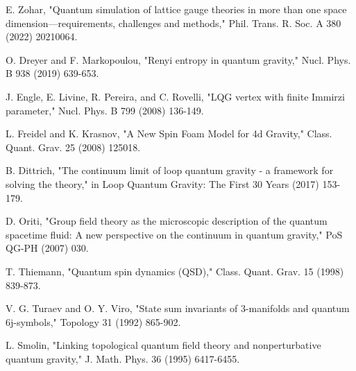 \documentclass[11pt, a4paper]{article}
\theoremstyle{plain}
\theoremstyle{definition}
\theoremstyle{remark}
\begin{document}
\begin{thebibliography}{99}
 E. Zohar, "Quantum simulation of lattice gauge theories in more than one space dimension—requirements, challenges and methods," Phil. Trans. R. Soc. A 380 (2022) 20210064.

 O. Dreyer and F. Markopoulou, "Renyi entropy in quantum gravity," Nucl. Phys. B 938 (2019) 639-653.

 J. Engle, E. Livine, R. Pereira, and C. Rovelli, "LQG vertex with finite Immirzi parameter," Nucl. Phys. B 799 (2008) 136-149.

 L. Freidel and K. Krasnov, "A New Spin Foam Model for 4d Gravity," Class. Quant. Grav. 25 (2008) 125018.

 B. Dittrich, "The continuum limit of loop quantum gravity - a framework for solving the theory," in Loop Quantum Gravity: The First 30 Years (2017) 153-179.

 D. Oriti, "Group field theory as the microscopic description of the quantum spacetime fluid: A new perspective on the continuum in quantum gravity," PoS QG-PH (2007) 030.

 T. Thiemann, "Quantum spin dynamics (QSD)," Class. Quant. Grav. 15 (1998) 839-873.

 V. G. Turaev and O. Y. Viro, "State sum invariants of 3-manifolds and quantum 6j-symbols," Topology 31 (1992) 865-902.

 L. Smolin, "Linking topological quantum field theory and nonperturbative quantum gravity," J. Math. Phys. 36 (1995) 6417-6455.

\end{thebibliography}
\end{document}
